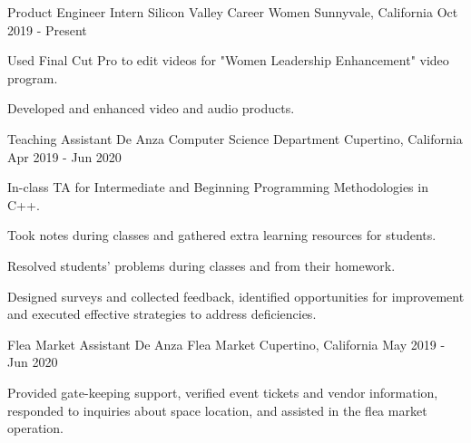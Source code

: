 

\begin{cventries}

  \cventry
    {Product Engineer Intern} %
    {Silicon Valley Career Women} %
    {Sunnyvale, California} %
    {Oct 2019 - Present} %
    {
	\begin{cvitems} %
      	\item Used Final Cut Pro to edit videos for "Women Leadership Enhancement" video program.
      	\item Developed and enhanced video and audio products.
	\end{cvitems}
    }
    
  \cventry
    {Teaching Assistant} %
    {De Anza Computer Science Department} %
    {Cupertino, California} %
    {Apr 2019 - Jun 2020} %
    {
	\begin{cvitems} %
      	\item In-class TA for Intermediate and Beginning Programming Methodologies in C++.
		\item Took notes during classes and gathered extra learning resources for students.       
      	\item Resolved students' problems during classes and from their homework.
      	\item Designed surveys and collected feedback, identified opportunities for improvement and executed effective strategies to address deficiencies.
	\end{cvitems}
    }
    
  \cventry
    {Flea Market Assistant} %
    {De Anza Flea Market} %
    {Cupertino, California} %
    {May 2019 - Jun 2020} %
    {
	\begin{cvitems} %
      	\item Provided gate-keeping support, verified event tickets and vendor information, responded to inquiries about space location, and assisted in the flea market operation.
	\end{cvitems}
    }
	  

\end{cventries}
